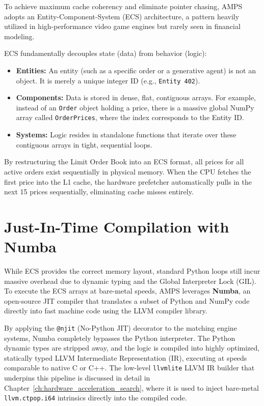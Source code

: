 To achieve maximum cache coherency and eliminate pointer chasing, AMPS adopts an Entity-Component-System (ECS) architecture, a pattern heavily utilized in high-performance video game engines but rarely seen in financial modeling.

ECS fundamentally decouples state (data) from behavior (logic):
\begin{itemize}
    \item \textbf{Entities:} An entity (such as a specific order or a generative agent) is not an object. It is merely a unique integer ID (e.g., \texttt{Entity 402}).
    \item \textbf{Components:} Data is stored in dense, flat, contiguous arrays. For example, instead of an \texttt{Order} object holding a price, there is a massive global NumPy array called \texttt{OrderPrices}, where the index corresponds to the Entity ID.
    \item \textbf{Systems:} Logic resides in standalone functions that iterate over these contiguous arrays in tight, sequential loops.
\end{itemize}

By restructuring the Limit Order Book into an ECS format, all prices for all active orders exist sequentially in physical memory. When the CPU fetches the first price into the L1 cache, the hardware prefetcher automatically pulls in the next 15 prices sequentially, eliminating cache misses entirely.

\section{Just-In-Time Compilation with Numba}

While ECS provides the correct memory layout, standard Python loops still incur massive overhead due to dynamic typing and the Global Interpreter Lock (GIL). To execute the ECS arrays at bare-metal speeds, AMPS leverages \textbf{Numba}, an open-source JIT compiler that translates a subset of Python and NumPy code directly into fast machine code using the LLVM compiler library.

By applying the \texttt{@njit} (No-Python JIT) decorator to the matching engine systems, Numba completely bypasses the Python interpreter. The Python dynamic types are stripped away, and the logic is compiled into highly optimized, statically typed LLVM Intermediate Representation (IR), executing at speeds comparable to native C or C++. The low-level \texttt{llvmlite} LLVM IR builder that underpins this pipeline is discussed in detail in Chapter~\ref{ch:hardware_acceleration_search}, where it is used to inject bare-metal \texttt{llvm.ctpop.i64} intrinsics directly into the compiled code.

